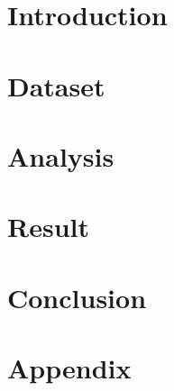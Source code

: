 \documentclass[paper=a4, fontsize=12pt]{scrartcl}
\numberwithin{equation}{section}		%
\numberwithin{figure}{section}			%
\numberwithin{table}{section}				%
\begin{document}
	
	

	\section{Introduction}
	
	\section{Dataset}
	
	\section{Analysis}
	
	\section{Result}
	
	\section{Conclusion}
	
	\section{Appendix}
	
	\clearpage
\end{document}
